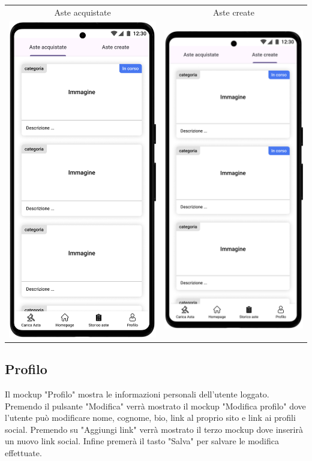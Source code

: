 \begin{center}
	\begin{tabular}{cc}
		Aste acquistate                                                                    &
		Aste create                                                                          \\
		\includegraphics[width=.35\textwidth]{images/mockup/Storico aste - acquistate.png} &
		\includegraphics[width=.35\textwidth]{images/mockup/Storico aste - create.png}       \\
	\end{tabular}
\end{center}

\newpage
\subsection{Profilo}
Il mockup "Profilo" mostra le informazioni personali dell'utente loggato.\\
Premendo il pulsante "Modifica" verrà mostrato il mockup "Modifica profilo" dove l'utente può modificare nome, cognome, bio, link al proprio sito e link ai profili social.
Premendo su "Aggiungi link" verrà mostrato il terzo mockup dove inserirà un nuovo link social.\meskip
Infine premerà il tasto "Salva" per salvare le modifica effettuate.

